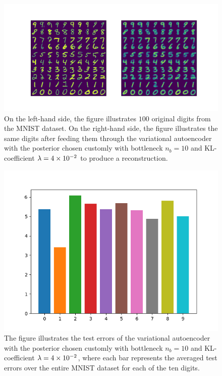 \begin{figure}
\begin{center}
      \includegraphics[trim = 15mm 10mm 15mm 15mm, clip, width=\linewidth]{convolutional_VAE_new_idea_KL_4e-2_10k_epochs_10D_inference}
\end{center}
\caption{On the left-hand side, the figure illustrates $100$ original digits from the MNIST dataset. On the right-hand side, the figure illustrates the same digits after feeding them through the variational autoencoder with the posterior chosen customly with bottleneck $n_b=10$ and KL-coefficient $\lambda=\num{4e-2}$ to produce a reconstruction.}\label{fig:convolutional_VAE_new_idea_KL_4e-2_10k_epochs_10D_inference}
\end{figure}


\begin{figure}
\begin{center}
      \includegraphics[width=0.49\linewidth]{convolutional_VAE_new_idea_KL_4e-2_10k_epochs_10D_errors}
\end{center}
\caption{The figure illustrates the test errors of the variational autoencoder with the posterior chosen customly with bottleneck $n_b=10$ and KL-coefficient $\lambda = \num{4e-2}$, where each bar represents the averaged test errors over the entire MNIST dataset for each of the ten digits.}\label{fig:convolutional_VAE_new_idea_KL_4e-2_10k_epochs_10D_errors}
\end{figure}


